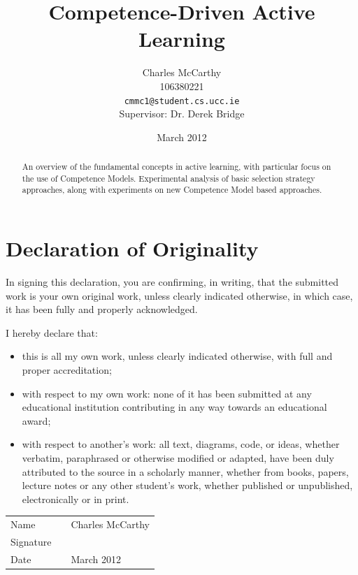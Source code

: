 \documentclass[a4paper,11pt]{report}
\title{Competence-Driven Active Learning}
\author{Charles McCarthy\\
  106380221\\
  \texttt{cmmc1@student.cs.ucc.ie}
  \\Supervisor: Dr. Derek Bridge}
\date{March 2012}
\begin{document}
\maketitle

\begin{abstract}
An overview of the fundamental concepts in active learning, with particular focus on the use of Competence Models. Experimental analysis of basic selection strategy approaches, along with experiments on new Competence Model based approaches.
\end{abstract}

\chapter*{Declaration of Originality}
\vspace*{\fill}
In signing this declaration, you are confirming, in writing, that the submitted work is your own original work, unless clearly indicated otherwise, in which case, it has been fully and properly acknowledged.

I hereby declare that:
\begin{itemize}
	\item this is all my own work, unless clearly indicated otherwise, with full and proper accreditation;
	\item with respect to my own work: none of it has been submitted at any educational institution contributing in any way towards an educational award;
	\item with respect to another's work: all text, diagrams, code, or ideas, whether verbatim, paraphrased or otherwise modified or adapted, have been duly attributed to the source in a scholarly manner, whether from books, papers, lecture notes or any other student's work, whether published or unpublished, electronically or in print. 
\end{itemize}

{
\renewcommand{\arraystretch}{4.5}
\begin{center}
 	\begin{tabular}{l @{:} p{0.4in} l}
		Name & & Charles McCarthy \\
		Signature & & \makebox[2.5in]{\hrulefill} \\
		Date & & March 2012 \\
	\end{tabular}
\end{center}
}
\vspace{\fill}
\end{document}
